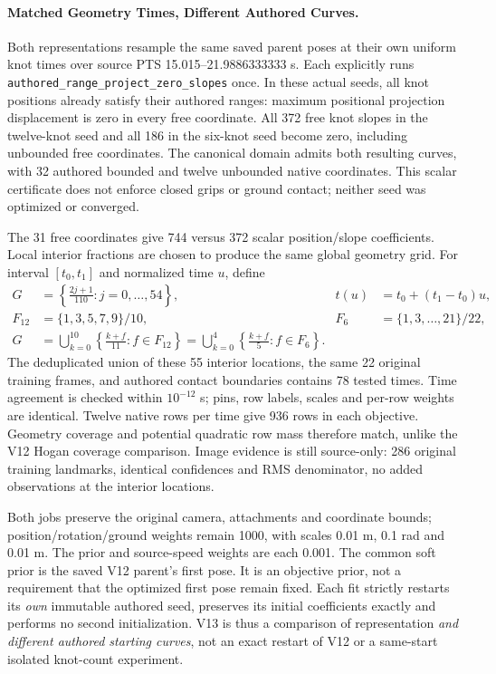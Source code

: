 \documentclass[11pt,letterpaper]{article}
\newcommand{\code}[1]{\nolinkurl{#1}}
\begin{document}
\paragraph{Matched Geometry Times, Different Authored Curves.}
Both representations resample the same saved parent poses at their own
uniform knot times over source PTS 15.015--21.9886333333 s. Each explicitly
runs \code{authored_range_project_zero_slopes} once. In these actual seeds,
all knot positions already satisfy their authored ranges: maximum positional
projection displacement is zero in every free coordinate. All 372 free
knot slopes in the twelve-knot seed and all 186 in the six-knot seed become
zero, including unbounded free coordinates. The canonical domain admits
both resulting curves, with 32 authored bounded and twelve unbounded native
coordinates. This scalar certificate does not enforce closed grips or ground
contact; neither seed was optimized or converged.

The 31 free coordinates give 744 versus 372 scalar position/slope
coefficients. Local interior fractions are chosen to produce the same global
geometry grid. For interval $[t_0,t_1]$ and normalized time $u$, define
\begin{equation}
\begin{aligned}
G &= \left\{\frac{2j+1}{110}:j=0,\ldots,54\right\},
& t(u)&=t_0+(t_1-t_0)u,\\
F_{12}&=\{1,3,5,7,9\}/10,
& F_6&=\{1,3,\ldots,21\}/22,\\
G&=\bigcup_{k=0}^{10}\left\{\frac{k+f}{11}:f\in F_{12}\right\}
 =\bigcup_{k=0}^{4}\left\{\frac{k+f}{5}:f\in F_6\right\}.
\end{aligned}
\label{eq:v13-common-grid}
\end{equation}
The deduplicated union of these 55 interior locations, the same 22 original
training frames, and authored contact boundaries contains 78 tested times.
Time agreement is checked within $10^{-12}$ s; pins, row labels, scales and
per-row weights are identical. Twelve native rows per time give 936 rows in
each objective. Geometry coverage and potential quadratic row mass therefore
match, unlike the V12 Hogan coverage comparison. Image evidence is still
source-only: 286 original training landmarks, identical confidences and RMS
denominator, no added observations at the interior locations.

Both jobs preserve the original camera, attachments and coordinate bounds;
position/rotation/ground weights remain 1000, with scales 0.01 m, 0.1 rad and
0.01 m. The prior and source-speed weights are each 0.001. The common soft
prior is the saved V12 parent's first pose. It is an objective prior, not a
requirement that the optimized first pose remain fixed. Each fit strictly
restarts its \emph{own} immutable authored seed, preserves its initial
coefficients exactly and performs no second initialization. V13 is thus a
comparison of representation \emph{and different authored starting curves},
not an exact restart of V12 or a same-start isolated knot-count experiment.
\end{document}
